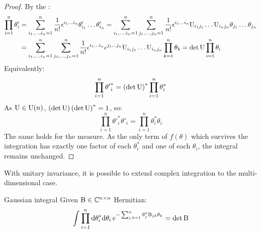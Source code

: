 \begin{proofbox}
  \begin{proof}
    By the :
    \begin{equation*}
      \begin{split}
        \prod_{i = 1}^n \theta'_i
        & = \sum_{i_1, \dots, i_n = 1}^n \frac{1}{n!} \epsilon^{i_1 \dots i_n} \theta'_{i_1} \dots \theta'_{i_n} = \sum_{i_1, \dots, i_n = 1}^n \sum_{j_1, \dots, j_n = 1}^n \frac{1}{n!} \epsilon^{i_1 \dots i_n} \mathrm{U}_{i_1 j_1} \dots \mathrm{U}_{i_n j_n} \theta_{j_1} \dots \theta_{j_n} \\
        & = \sum_{i_1, \dots, i_n = 1}^n \sum_{j_1, \dots, j_n = 1}^n \frac{1}{n!} \epsilon^{i_1 \dots i_n} \epsilon^{j_1 \dots j_n} \mathrm{U}_{i_1 j_1} \dots \mathrm{U}_{i_n j_n} \prod_{k = 1}^n \theta_k = \det \mathrm{U} \prod_{i = 1}^n \theta_i
      \end{split}
    \end{equation*}
    Equivalently:
    \begin{equation*}
      \prod_{i = 1}^n {\theta'}^*_i = \left( \det \mathrm{U} \right)^* \prod_{i = 1}^n \theta_i^*
    \end{equation*}
    As $ \mathrm{U} \in \mathrm{U}(n) $, $ \left( \det \mathrm{U} \right) \left( \det \mathrm{U} \right)^* = 1 $, so:
    \begin{equation*}
      \prod_{i = 1}^n {\theta'}^*_i \theta'_i = \prod_{i = 1}^n \theta_i^* \theta_i
    \end{equation*}
    The same holds for the measure. As the only term of $ f(\theta) $ which survives the integration has exactly one factor of each $ \theta_i^* $ and one of each $ \theta_i $, the integral remains unchanged.
  \end{proof}
\end{proofbox}

With unitary invariance, it is possible to extend complex integration to the multi-dimensional case.

\begin{lemma}{Gaussian integral}{}
  Given $ \mathrm{B} \in \mathbb{C}^{n \times n} $ Hermitian:
  \begin{equation}
    \int \prod_{i = 1}^n \mathrm{d} \theta^*_i \mathrm{d} \theta_i\, e^{- \sum_{j,k = 1}^n \theta_j^* \mathrm{B}_{jk} \theta_k} = \det \mathrm{B}
  \end{equation}
\end{lemma}

